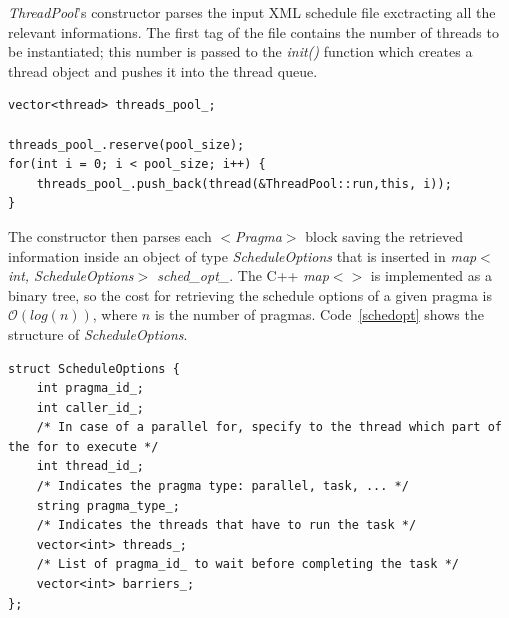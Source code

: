 \documentclass[a4paper,11pt,oneside]{book}
\begin{document}
\emph{ThreadPool}’s constructor parses the input XML schedule file exctracting all the relevant informations. The first tag of the file contains the number of threads to be instantiated; this number is passed to the \emph{init()} function which creates a thread object and pushes it into the thread queue.

\begin{lstlisting}[language=CCC, caption=Initialization of the thread pool., label=pool]
vector<thread> threads_pool_;

threads_pool_.reserve(pool_size);
for(int i = 0; i < pool_size; i++) {
    threads_pool_.push_back(thread(&ThreadPool::run,this, i));
}
\end{lstlisting}

The constructor then parses each \emph{$<$Pragma$>$} block saving the retrieved information inside an object of type \emph{ScheduleOptions} that is inserted in \emph{map$<$int, ScheduleOptions$>$ sched\_opt\_}. The C++ \emph{map$<>$} is implemented as a binary tree, so the cost for retrieving the schedule options of a given pragma is $\mathcal{O}(log(n))$, where $n$ is the number of pragmas.  Code~\ref{schedopt} shows the structure of \emph{ScheduleOptions}.

\begin{lstlisting}[language=CCC, label=schedopt]
struct ScheduleOptions {
    int pragma_id_;
    int caller_id_;
    /* In case of a parallel for, specify to the thread which part of the for to execute */
    int thread_id_;
    /* Indicates the pragma type: parallel, task, ... */
    string pragma_type_;
    /* Indicates the threads that have to run the task */
    vector<int> threads_;
    /* List of pragma_id_ to wait before completing the task */
    vector<int> barriers_;
};
\end{lstlisting}
\end{document}

